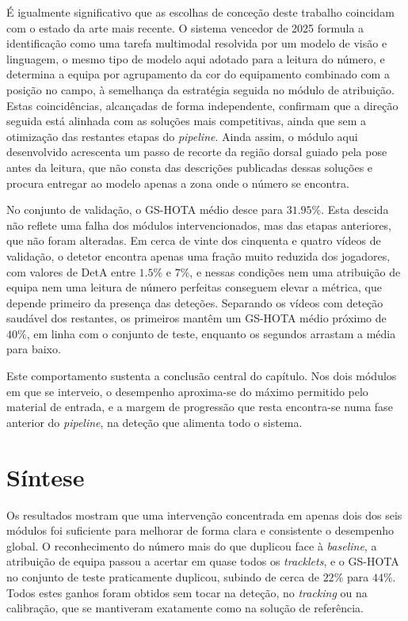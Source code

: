 É igualmente significativo que as escolhas de conceção deste trabalho coincidam com o estado
da arte mais recente. O sistema vencedor de 2025 formula a identificação como uma tarefa
multimodal resolvida por um modelo de visão e linguagem, o mesmo tipo de modelo aqui adotado
para a leitura do número, e determina a equipa por agrupamento da cor do equipamento
combinado com a posição no campo, à semelhança da estratégia seguida no módulo de atribuição.
Estas coincidências, alcançadas de forma independente, confirmam que a direção seguida está
alinhada com as soluções mais competitivas, ainda que sem a otimização das restantes etapas
do \emph{pipeline}. Ainda assim, o módulo aqui desenvolvido acrescenta um passo de recorte da
região dorsal guiado pela pose antes da leitura, que não consta das descrições publicadas
dessas soluções e procura entregar ao modelo apenas a zona onde o número se encontra.

No conjunto de validação, o GS-HOTA médio desce para $31.95\%$. Esta descida não reflete uma
falha dos módulos intervencionados, mas das etapas anteriores, que não foram alteradas. Em
cerca de vinte dos cinquenta e quatro vídeos de validação, o detetor encontra apenas uma
fração muito reduzida dos jogadores, com valores de DetA entre $1.5\%$ e $7\%$, e nessas
condições nem uma atribuição de equipa nem uma leitura de número perfeitas conseguem elevar a
métrica, que depende primeiro da presença das deteções. Separando os vídeos com deteção
saudável dos restantes, os primeiros mantêm um GS-HOTA médio próximo de $40\%$, em linha com
o conjunto de teste, enquanto os segundos arrastam a média para baixo.

Este comportamento sustenta a conclusão central do capítulo. Nos dois módulos em que se
interveio, o desempenho aproxima-se do máximo permitido pelo material de entrada, e a margem
de progressão que resta encontra-se numa fase anterior do \emph{pipeline}, na deteção que
alimenta todo o sistema.


\section{Síntese}
\label{sec:res_sintese}

Os resultados mostram que uma intervenção concentrada em apenas dois dos seis módulos foi
suficiente para melhorar de forma clara e consistente o desempenho global. O reconhecimento
do número mais do que duplicou face à \emph{baseline}, a atribuição de equipa passou a
acertar em quase todos os \emph{tracklets}, e o GS-HOTA no conjunto de teste praticamente
duplicou, subindo de cerca de $22\%$ para $44\%$. Todos estes ganhos foram obtidos sem tocar
na deteção, no \emph{tracking} ou na calibração, que se mantiveram exatamente como na solução
de referência.


